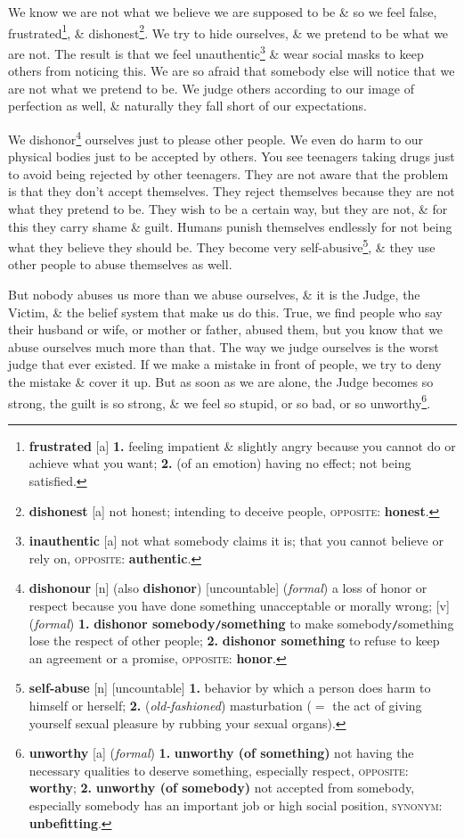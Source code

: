 \documentclass[oneside]{book}
\numberwithin{equation}{section}
\begin{document}
We know we are not what we believe we are supposed to be \& so we feel false, frustrated\footnote{\textbf{frustrated} [a] \textbf{1.} feeling impatient \& slightly angry because you cannot do or achieve what you want; \textbf{2.} (of an emotion) having no effect; not being satisfied.}, \& dishonest\footnote{\textbf{dishonest} [a] not honest; intending to deceive people, \textsc{opposite}: \textbf{honest}.}. We try to hide ourselves, \& we pretend to be what we are not. The result is that we feel unauthentic\footnote{\textbf{inauthentic} [a] not what somebody claims it is; that you cannot believe or rely on, \textsc{opposite}: \textbf{authentic}.} \& wear social masks to keep others from noticing this. We are so afraid that somebody else will notice that we are not what we pretend to be. We judge others according to our image of perfection as well, \& naturally they fall short of our expectations.

We dishonor\footnote{\textbf{dishonour} [n] (also \textbf{dishonor}) [uncountable] (\textit{formal}) a loss of honor or respect because you have done something unacceptable or morally wrong; [v] (\textit{formal}) \textbf{1.} \textbf{dishonor somebody\texttt{/}something} to make somebody\texttt{/}something lose the respect of other people; \textbf{2.} \textbf{dishonor something} to refuse to keep an agreement or a promise, \textsc{opposite}: \textbf{honor}.} ourselves just to please other people. We even do harm to our physical bodies just to be accepted by others. You see teenagers taking drugs just to avoid being rejected by other teenagers. They are not aware that the problem is that they don't accept themselves. They reject themselves because they are not what they pretend to be. They wish to be a certain way, but they are not, \& for this they carry shame \& guilt. Humans punish themselves endlessly for not being what they believe they should be. They become very self-abusive\footnote{\textbf{self-abuse} [n] [uncountable] \textbf{1.} behavior by which a person does harm to himself or herself; \textbf{2.} (\textit{old-fashioned}) masturbation ($=$ the act of giving yourself sexual pleasure by rubbing your sexual organs).}, \& they use other people to abuse themselves as well.

But nobody abuses us more than we abuse ourselves, \& it is the Judge, the Victim, \& the belief system that make us do this. True, we find people who say their husband or wife, or mother or father, abused them, but you know that we abuse ourselves much more than that. The way we judge ourselves is the worst judge that ever existed. If we make a mistake in front of people, we try to deny the mistake \& cover it up. But as soon as we are alone, the Judge becomes so strong, the guilt is so strong, \& we feel so stupid, or so bad, or so unworthy\footnote{\textbf{unworthy} [a] (\textit{formal}) \textbf{1.} \textbf{unworthy (of something)} not having the necessary qualities to deserve something, especially respect, \textsc{opposite}: \textbf{worthy}; \textbf{2.} \textbf{unworthy (of somebody)} not accepted from somebody, especially somebody has an important job or high social position, \textsc{synonym}: \textbf{unbefitting}.}.
\end{document}
